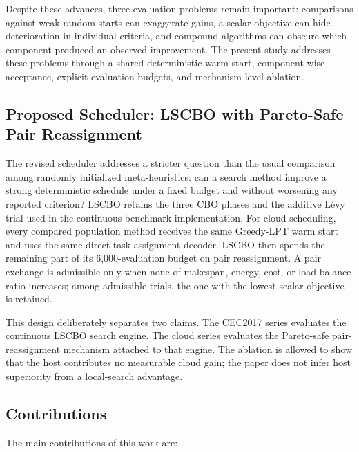\documentclass[pdflatex,onecolumn,sn-mathphys-num]{sn-jnl}
\begin{document}
Despite these advances, three evaluation problems remain important: comparisons against weak random starts can exaggerate gains, a scalar objective can hide deterioration in individual criteria, and compound algorithms can obscure which component produced an observed improvement. The present study addresses these problems through a shared deterministic warm start, component-wise acceptance, explicit evaluation budgets, and mechanism-level ablation.

\subsection{Proposed Scheduler: LSCBO with Pareto-Safe Pair Reassignment}
The revised scheduler addresses a stricter question than the usual comparison among randomly initialized meta-heuristics: can a search method improve a strong deterministic schedule under a fixed budget and without worsening any reported criterion? LSCBO retains the three CBO phases and the additive L\'{e}vy trial used in the continuous benchmark implementation. For cloud scheduling, every compared population method receives the same Greedy-LPT warm start and uses the same direct task-assignment decoder. LSCBO then spends the remaining part of its 6,000-evaluation budget on pair reassignment. A pair exchange is admissible only when none of makespan, energy, cost, or load-balance ratio increases; among admissible trials, the one with the lowest scalar objective is retained.

This design deliberately separates two claims. The CEC2017 series evaluates the continuous LSCBO search engine. The cloud series evaluates the Pareto-safe pair-reassignment mechanism attached to that engine. The ablation is allowed to show that the host contributes no measurable cloud gain; the paper does not infer host superiority from a local-search advantage.

\subsection{Contributions}
The main contributions of this work are:
\end{document}
